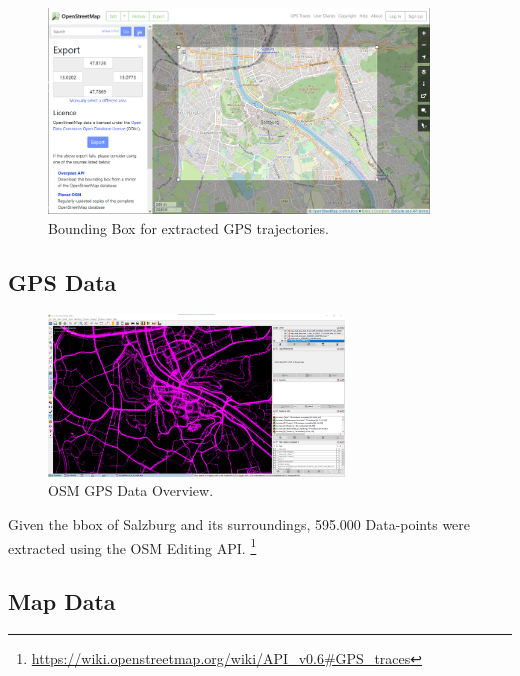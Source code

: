 \begin{figure}[!ht]
  \centering
  \includegraphics[width=0.9\textwidth]{images/BoundingBoxOSM.png}
  \caption{
  Bounding Box for extracted GPS trajectories.
  }
  \label{figure:BoundingBox}
\end{figure}


\subsection{GPS Data}

\begin{figure}[!ht]
  \centering
  \includegraphics[width=0.7\textwidth]{images/GPSDataOSM.png}
  \caption{
  OSM GPS Data Overview.
  }
  \label{figure:MapData}
\end{figure}

Given the bbox of Salzburg and its surroundings, 595.000 Data-points were extracted using the OSM Editing API. \footnote{\url{https://wiki.openstreetmap.org/wiki/API_v0.6#GPS_traces}}

\subsection{Map Data}

